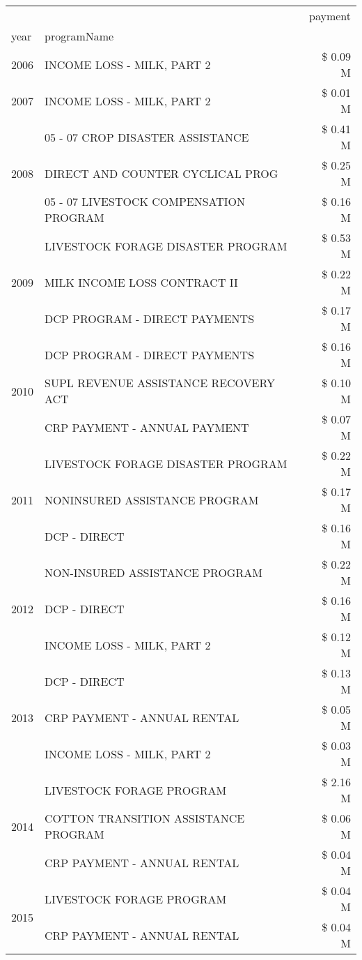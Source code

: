 \begin{tabular}{llr}
\toprule
 &  & payment \\
year & programName &  \\
\midrule
2006 & INCOME LOSS - MILK, PART 2 & \$ 0.09 M \\
\cline{1-3}
2007 & INCOME LOSS - MILK, PART 2 & \$ 0.01 M \\
\cline{1-3}
\multirow[t]{3}{*}{2008} & 05 - 07 CROP DISASTER ASSISTANCE & \$ 0.41 M \\
 & DIRECT AND COUNTER CYCLICAL PROG & \$ 0.25 M \\
 & 05 - 07 LIVESTOCK COMPENSATION PROGRAM & \$ 0.16 M \\
\cline{1-3}
\multirow[t]{3}{*}{2009} & LIVESTOCK FORAGE DISASTER  PROGRAM & \$ 0.53 M \\
 & MILK INCOME LOSS CONTRACT II & \$ 0.22 M \\
 & DCP PROGRAM - DIRECT PAYMENTS & \$ 0.17 M \\
\cline{1-3}
\multirow[t]{3}{*}{2010} & DCP PROGRAM - DIRECT PAYMENTS & \$ 0.16 M \\
 & SUPL REVENUE ASSISTANCE RECOVERY ACT & \$ 0.10 M \\
 & CRP PAYMENT - ANNUAL PAYMENT & \$ 0.07 M \\
\cline{1-3}
\multirow[t]{3}{*}{2011} & LIVESTOCK FORAGE DISASTER PROGRAM & \$ 0.22 M \\
 & NONINSURED ASSISTANCE PROGRAM & \$ 0.17 M \\
 & DCP - DIRECT & \$ 0.16 M \\
\cline{1-3}
\multirow[t]{3}{*}{2012} & NON-INSURED ASSISTANCE PROGRAM & \$ 0.22 M \\
 & DCP - DIRECT & \$ 0.16 M \\
 & INCOME LOSS - MILK, PART 2 & \$ 0.12 M \\
\cline{1-3}
\multirow[t]{3}{*}{2013} & DCP - DIRECT & \$ 0.13 M \\
 & CRP PAYMENT - ANNUAL RENTAL & \$ 0.05 M \\
 & INCOME LOSS - MILK, PART 2 & \$ 0.03 M \\
\cline{1-3}
\multirow[t]{3}{*}{2014} & LIVESTOCK FORAGE PROGRAM & \$ 2.16 M \\
 & COTTON TRANSITION ASSISTANCE PROGRAM & \$ 0.06 M \\
 & CRP PAYMENT - ANNUAL RENTAL & \$ 0.04 M \\
\cline{1-3}
\multirow[t]{3}{*}{2015} & LIVESTOCK FORAGE PROGRAM & \$ 0.04 M \\
 & CRP PAYMENT - ANNUAL RENTAL & \$ 0.04 M \\

\end{tabular}

